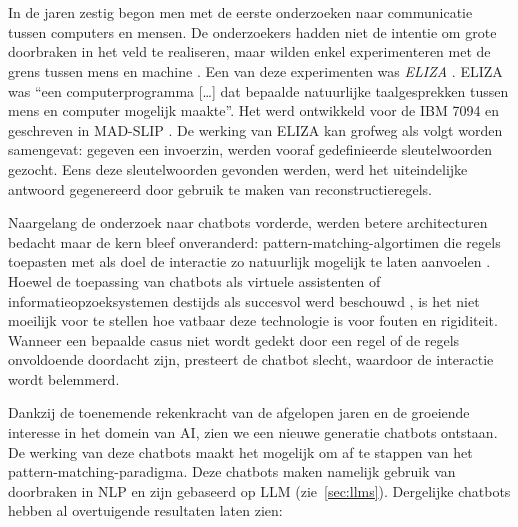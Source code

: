 \chapter{}%
\label{ch:literatuurstudie}

\section{}%
\label{sec:evolutie-chatbots}

In de jaren zestig begon men met de eerste onderzoeken naar communicatie tussen computers en mensen. De onderzoekers hadden niet de intentie om grote doorbraken in het veld te realiseren, maar wilden enkel experimenteren met de grens tussen mens en machine \autocite{Dibitonto2018, AbuShawar2007}. Een van deze experimenten was \emph{ELIZA} \autocite{Weizenbaum1966}. ELIZA was ``een computerprogramma [\ldots] dat bepaalde natuurlijke taalgesprekken tussen mens en computer mogelijk maakte''. Het werd ontwikkeld voor de IBM 7094 en geschreven in MAD-SLIP \autocite{Weizenbaum1966}. De werking van ELIZA kan grofweg als volgt worden samengevat: gegeven een invoerzin, werden vooraf gedefinieerde sleutelwoorden gezocht. Eens deze sleutelwoorden gevonden werden, werd het uiteindelijke antwoord gegenereerd door gebruik te maken van reconstructieregels.

Naargelang de onderzoek naar chatbots vorderde, werden betere architecturen bedacht maar de kern bleef onveranderd: pattern-matching-algortimen die regels toepasten met als doel de interactie zo natuurlijk mogelijk te laten aanvoelen \autocite{AbuShawar2007}. Hoewel de toepassing van chatbots als virtuele assistenten of informatieopzoeksystemen destijds als succesvol werd beschouwd \autocite{AbuShawar2007}, is het niet moeilijk voor te stellen hoe vatbaar deze technologie is voor fouten en rigiditeit. Wanneer een bepaalde casus niet wordt gedekt door een regel of de regels onvoldoende doordacht zijn, presteert de chatbot slecht, waardoor de interactie wordt belemmerd. 

Dankzij de toenemende rekenkracht van de afgelopen jaren en de groeiende interesse in het domein van \acrlong{AI}, zien we een nieuwe generatie chatbots ontstaan. De werking van deze chatbots maakt het mogelijk om af te stappen van het pattern-matching-paradigma. Deze chatbots maken namelijk gebruik van doorbraken in \acrfull{NLP} en zijn gebaseerd op \acrfull{LLM} (zie~\ref{sec:llms}). Dergelijke chatbots hebben al overtuigende resultaten laten zien:

